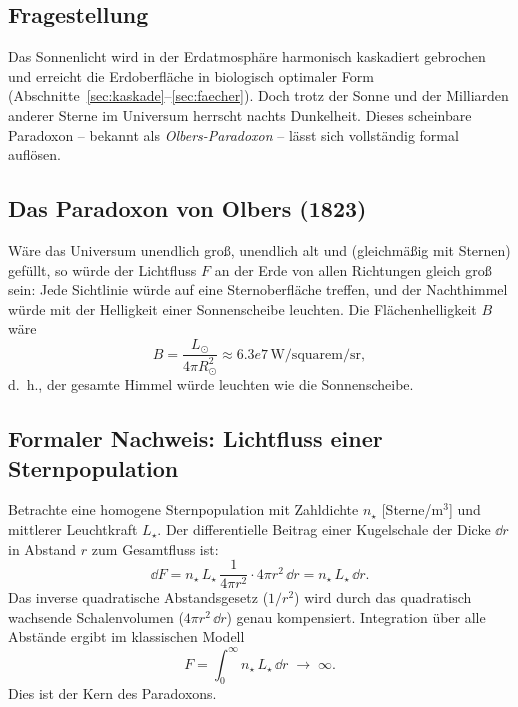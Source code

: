 \documentclass[12pt,a4paper]{article}
\providecommand{\SI}[2]{\ensuremath{#1\,#2}}
\providecommand{\per}{/}
\providecommand{\square}{\mathrm{square}}
\providecommand{\steradian}{\mathrm{sr}}
\providecommand{\watt}{\mathrm{W}}
\providecommand{\metre}{\mathrm{m}}
\begin{document}
\subsection{Fragestellung}

Das Sonnenlicht wird in der Erdatmosphäre harmonisch kaskadiert
gebrochen und erreicht die Erdoberfläche in biologisch optimaler
Form (Abschnitte~\ref{sec:kaskade}--\ref{sec:faecher}).
Doch trotz der Sonne und der Milliarden anderer Sterne
im Universum herrscht nachts Dunkelheit.
Dieses scheinbare Paradoxon -- bekannt als \emph{Olbers-Paradoxon}
\citep{Harrison1987} -- lässt sich vollständig formal auflösen.

\subsection{Das Paradoxon von Olbers (1823)}

Wäre das Universum unendlich groß, unendlich alt und
(gleichmäßig mit Sternen) gefüllt, so würde der Lichtfluss $F$
an der Erde von allen Richtungen gleich groß sein:
Jede Sichtlinie würde auf eine Sternoberfläche treffen,
und der Nachthimmel würde mit der Helligkeit einer Sonnenscheibe
leuchten.
Die Flächenhelligkeit $B$ wäre
\begin{equation}
  B = \frac{L_\odot}{4\pi R_\odot^2} \approx \SI{6.3e7}{\watt\per\square\metre\per\steradian},
  \label{eq:B_olbers}
\end{equation}
d.\ h., der gesamte Himmel würde leuchten wie die Sonnenscheibe.

\subsection{Formaler Nachweis: Lichtfluss einer Sternpopulation}

Betrachte eine homogene Sternpopulation mit Zahldichte
$n_\star$ [Sterne/m$^3$] und mittlerer Leuchtkraft $L_\star$.
Der differentielle Beitrag einer Kugelschale der Dicke $\dd r$
in Abstand $r$ zum Gesamtfluss ist:
\begin{equation}
  \dd F = n_\star\,L_\star\,\frac{1}{4\pi r^2}\cdot 4\pi r^2\,\dd r
        = n_\star\,L_\star\,\dd r.
  \label{eq:dF_schale}
\end{equation}
Das inverse quadratische Abstandsgesetz ($1/r^2$) wird durch das
quadratisch wachsende Schalenvolumen ($4\pi r^2\,\dd r$) genau
kompensiert.
Integration über alle Abstände ergibt im klassischen Modell
\begin{equation}
  F = \int_0^\infty n_\star\,L_\star\,\dd r \;\longrightarrow\; \infty.
  \label{eq:F_divergent}
\end{equation}
Dies ist der Kern des Paradoxons.
\end{document}
